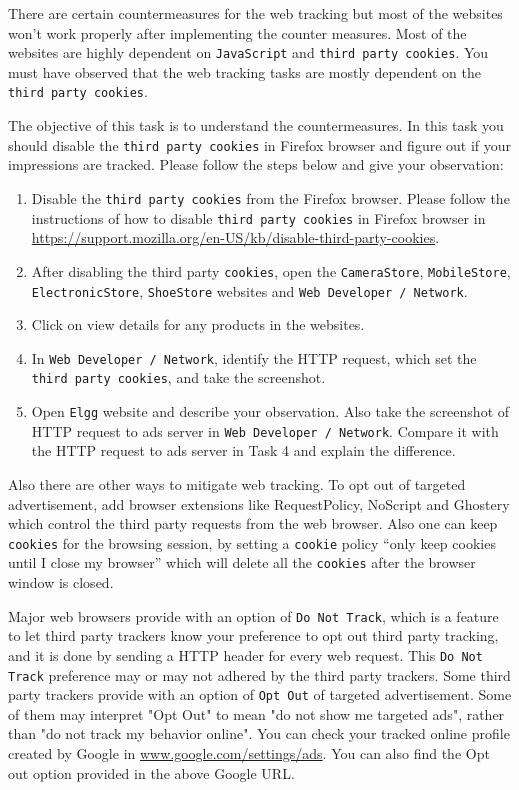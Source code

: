 There are certain countermeasures for the web tracking but most of the websites won't work properly after implementing the counter measures. 
Most of the websites are highly dependent on {\tt JavaScript} and {\tt third party cookies}. 
You must have observed that the web tracking tasks are mostly dependent on the {\tt third party cookies}.

The objective of this task is to understand the countermeasures. 
In this task you should disable the {\tt third party cookies} in Firefox browser and figure out if your impressions are tracked. 
Please follow the steps below and give your observation:

\begin{enumerate}
  \item Disable the {\tt third party cookies} from the Firefox browser. Please follow the instructions of how to disable {\tt third party cookies} in Firefox browser in \url{https://support.mozilla.org/en-US/kb/disable-third-party-cookies}.
  \item After disabling the third party {\tt cookies}, open the {\tt CameraStore}, {\tt MobileStore}, {\tt ElectronicStore}, {\tt ShoeStore} websites and {\tt Web Developer / Network}.
  \item Click on view details for any products in the websites.
  \item In {\tt Web Developer / Network}, identify the HTTP request, which set the {\tt third party cookies}, and take the screenshot.
  \item Open {\tt Elgg} website and describe your observation. Also take the screenshot of HTTP request to ads server in {\tt Web Developer / Network}. Compare it with the HTTP request to ads server in Task 4 and explain the difference.

\end{enumerate}

Also there are other ways to mitigate web tracking. To opt out of targeted advertisement, 
add browser extensions like RequestPolicy, NoScript and Ghostery which control the third party requests from the web browser. 
Also one can keep {\tt cookies} for the browsing session, by setting a {\tt cookie} policy “only keep cookies until I close my browser” 
which will delete all the {\tt cookies} after the browser window is closed. 

Major web browsers provide with an option of {\tt Do Not Track}, which is a feature to let third party trackers know your preference to opt out third party tracking, 
and it is done by sending a HTTP header for every web request. 
This {\tt Do Not Track} preference may or may not adhered by the third party trackers. 
Some third party trackers provide with an option of {\tt Opt Out} of targeted advertisement. 
Some of them may interpret "Opt Out" to mean "do not show me targeted ads", rather than "do not track my behavior online". 
You can check your tracked online profile created by Google in \url{www.google.com/settings/ads}. 
You can also find the Opt out option provided in the above Google URL.

